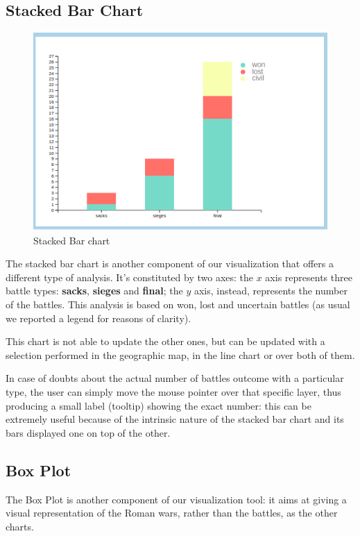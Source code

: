 \subsection{Stacked Bar Chart}
\begin{figure}[h]
    \centering
    \includegraphics[scale=0.30]{./images/stacked_bar_chart.png}
    \caption{Stacked Bar chart}
\end{figure}
The stacked bar chart is another component of our visualization that offers a different type of analysis.
It's constituted by two axes: the $x$ axis represents three battle types: \textbf{sacks}, \textbf{sieges} and \textbf{final}; the $y$ axis, instead, represents the number of the battles. This analysis is based on won, lost and uncertain battles (as usual we reported a legend for reasons of clarity).

This chart is not able to update the other ones, but can be updated with a selection performed in the geographic map, in the line chart or over both of them.

In case of doubts about the actual number of battles outcome with a particular type, the user can simply move the mouse pointer over that specific layer, thus producing a small label (tooltip) showing the exact number: this can be extremely useful because of the intrinsic nature of the stacked bar chart and its bars displayed one on top of the other.

\subsection{Box Plot}
The Box Plot is another component of our visualization tool: it aims at giving a visual representation of the Roman wars, rather than the battles, as the other charts.

